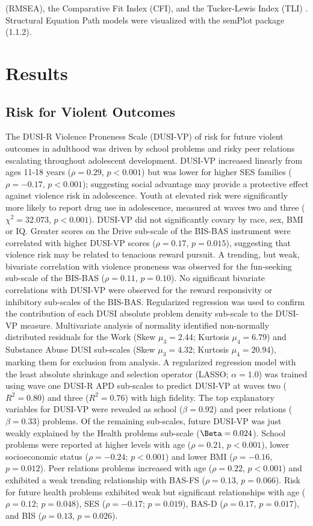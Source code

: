\documentclass[utf8]{frontiersSCNS} %
\begin{document}
(RMSEA), the Comparative Fit Index (CFI), and the Tucker-Lewis Index (TLI) \citep{KennyEtAl2015,HuTzeBentler1999, wu2009evaluating}. Structural Equation Path models were visualized with the semPlot package (1.1.2). 

\section{Results} 
\subsection{Risk for Violent Outcomes} The DUSI-R Violence Proneness Scale (DUSI-VP) of risk for future violent outcomes in adulthood was driven by school problems and risky peer relations escalating throughout adolescent development. DUSI-VP increased linearly from ages 11-18 years ($\rho=0.29$,  $p<0.001$) but was lower for higher SES families ($\rho=-0.17$, $p<0.001$); suggesting social advantage may provide a protective effect against violence risk in adolescence. Youth at elevated risk were significantly more likely to report drug use in adolescence, measured at waves two and three ($\chi^2 = 32.073$, $p<0.001$). DUSI-VP did not significantly covary by race, sex, BMI or IQ. Greater scores on the Drive sub-scale of the BIS-BAS instrument were correlated with higher DUSI-VP scores ($\rho=0.17$, $p=0.015$), suggesting that violence risk may be related to tenacious reward pursuit. A trending, but weak, bivariate correlation with violence proneness was observed for the fun-seeking sub-scale of the BIS-BAS ($\rho=0.11$, $p=0.10$). No significant bivariate correlations with DUSI-VP were observed for the reward responsivity or inhibitory sub-scales of the BIS-BAS. Regularized regression was used to confirm the contribution of each DUSI absolute problem density sub-scale to the DUSI-VP measure. Multivariate analysis of normality identified non-normally distributed residuals for the Work (Skew $\mu_3=2.44$; Kurtosis $\mu_4=6.79$) and Substance Abuse DUSI sub-scales (Skew $\mu_3=4.32$; Kurtosis $\mu_4=20.94$), marking them for exclusion from analysis. A regularized regression model with the least absolute shrinkage and selection operator (LASSO; $\alpha=1.0$) was trained using wave one DUSI-R APD sub-scales to predict DUSI-VP at waves two ($R^2=0.80$) and three ($R^2=0.76$) with high fidelity. The top explanatory variables for DUSI-VP were revealed as school ($\beta=0.92$) and peer relations ($\beta=0.33$) problems. Of the remaining sub-scales, future DUSI-VP was just weakly explained by the Health problems sub-scale ($\Beta=0.024$). School problems were reported at higher levels with age ($\rho=0.21$, $p<0.001$), lower socioeconomic status ($\rho=-0.24$; $p<0.001$) and lower BMI ($\rho=-0.16$, $p=0.012$). Peer relations problems increased with age ($\rho=0.22$, $p<0.001$) and exhibited a weak trending relationship with BAS-FS ($\rho=0.13$, $p=0.066$). Risk for future health problems exhibited weak but significant relationships with age ($\rho=0.12$; $p=0.048$), SES ($\rho=-0.17$; $p=0.019$), BAS-D ($\rho=0.17$, $p=0.017$), and BIS ($\rho=0.13$, $p=0.026$). 
%
\vspace{20pt}
\end{document}
